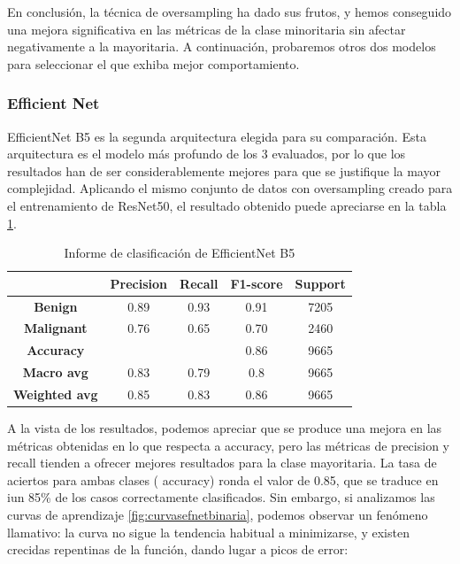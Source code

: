 En conclusión, la técnica de oversampling ha dado sus frutos, y hemos conseguido una mejora significativa en las métricas de la clase minoritaria sin afectar negativamente a la mayoritaria. A continuación, probaremos otros dos modelos para seleccionar el que exhiba mejor comportamiento.

\subsubsection{Efficient Net}

EfficientNet B5 es la segunda arquitectura elegida para su comparación. Esta arquitectura es el modelo más profundo de los 3 evaluados, por lo que los resultados han de ser considerablemente mejores para que se justifique la mayor complejidad. Aplicando el mismo conjunto de datos con oversampling creado para el entrenamiento de ResNet50, el resultado obtenido puede apreciarse en la tabla \ref{tab:resefnet}.

\begin{table}[H]
	\centering
	\begin{tabular}{|c|c|c|c|c|}
		\hline
		\textbf{} & \textbf{Precision} & \textbf{Recall} & \textbf{F1-score} & \textbf{Support} \\ \hline
		\textbf{Benign} & 0.89 & 0.93 & 0.91 & 7205 \\ \hline
		\textbf{Malignant} & 0.76 & 0.65 & 0.70 & 2460 \\ \hline
		\textbf{Accuracy} &  &  & 0.86 & 9665 \\ \hline
		\textbf{Macro avg} & 0.83& 0.79 & 0.8 & 9665 \\ \hline
		\textbf{Weighted avg} & 0.85 & 0.83 & 0.86 & 9665 \\ \hline
	\end{tabular}
	\caption{Informe de clasificación de EfficientNet B5}
	\label{tab:resefnet}
\end{table}

A la vista de los resultados, podemos apreciar que se produce una mejora en las métricas obtenidas en lo que respecta a accuracy, pero las métricas de precision y recall tienden a ofrecer mejores resultados para la clase mayoritaria. La tasa de aciertos para ambas clases ( accuracy) ronda el valor de 0.85, que se traduce en iun 85\% de los casos correctamente clasificados.  Sin embargo, si analizamos las curvas de aprendizaje \ref{fig:curvasefnetbinaria}, podemos observar un fenómeno llamativo: la curva no sigue la tendencia habitual a minimizarse, y existen crecidas repentinas de la función, dando lugar a picos de error:

